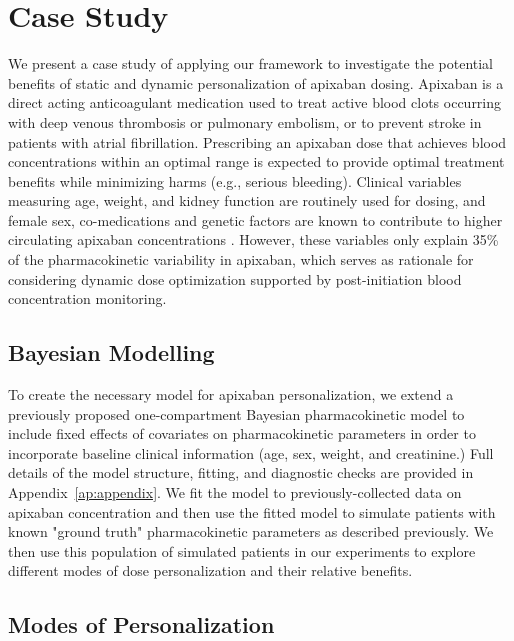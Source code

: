 \section{Case Study}\label{ss:casestudy}

We present a case study of applying our framework to investigate the potential benefits of static and dynamic personalization of apixaban dosing. Apixaban is a direct acting anticoagulant medication used to treat active blood clots occurring with deep venous thrombosis or pulmonary embolism, or to prevent stroke in patients with atrial fibrillation. Prescribing an apixaban dose that achieves blood concentrations within an optimal range is expected to provide optimal treatment benefits while minimizing harms (e.g., serious bleeding). Clinical variables measuring age, weight, and kidney function are routinely used for dosing, and female sex, co-medications and genetic factors are known to contribute to higher circulating apixaban concentrations \cite{gulilat2020drug}. However, these variables only explain 35\% of the pharmacokinetic variability in apixaban, which serves as rationale for considering dynamic dose optimization supported by post-initiation blood concentration monitoring. 

\subsection{Bayesian Modelling}

To create the necessary model for apixaban personalization, we extend a previously proposed one-compartment Bayesian pharmacokinetic model \cite{pananos2020comparisons} to include fixed effects of covariates on pharmacokinetic parameters in order to incorporate baseline clinical information (age, sex, weight, and creatinine.)  Full details of the model structure, fitting, and diagnostic checks are provided in Appendix~\ref{ap:appendix}. We fit the model to previously-collected data on apixaban concentration \cite{tirona2018apixaban} and then use the fitted model to simulate patients with known "ground truth" pharmacokinetic parameters as described previously. We then use this population of simulated patients in our experiments to explore different modes of dose personalization and their relative benefits.

\subsection{Modes of Personalization}

